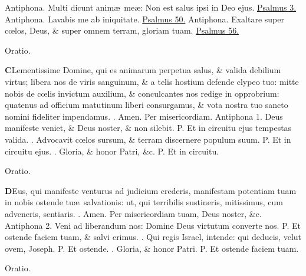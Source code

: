 \documentclass[letter,11pt]{book}
\makeatletter
\DeclareRobustCommand{\Vbar}{\vers@resp{-0.1em}{V}}
\DeclareRobustCommand{\Rbar}{\vers@resp{0pt}{R}}
\newcommand{\vers@resp@sym}{\raisebox{0.2ex}{\rotatebox[origin=c]{-20}{$\m@th\rceil$}}}
\newcommand{\vers@resp}[2]{%
  {\ooalign{\hidewidth\kern#1\vers@resp@sym\hidewidth\cr#2\cr}}%
}%
\def\P{\color{Red} P. \color{black}}
\def\V{\color{Red} \Vbar . \color{black}}
\def\R{\color{Red} \Rbar . \color{black}}
\makeatother
\begin{document}
\begin{multicols}{2}
\newline \color{Red} Antiphona. \color{black} Multi dicunt anim\ae \ me\ae : Non est salus ipsi in Deo ejus. \color{Red} \hyperlink{ps3}{Psalmus 3.} \color{black}
\newline \color{Red} Antiphona. \color{black} Lavabis me ab iniquitate. \color{Red} \hyperlink{ps50}{Psalmus 50.} \color{black}
\newline \color{Red} Antiphona. \color{black} Exaltare super c\oe los, Deus, \& super omnem terram, gloriam tuam. \color{Red} \hyperlink{ps56}{Psalmus 56.} \color{black}
\vspace{-.75em} \begin{center} \color{Red} Oratio. \end{center} \vspace{-.75em}
\lettrine[lines=2]{\bfseries \color{Red} C}{}Lementissime Domine, qui es animarum perpetua salus, \& valida debilium virtus; libera nos de viris sanguinum, \& a telis hostium defende clypeo tuo: mitte nobis de c\oe lis invictum auxilium, \& conculcantes nos redige in opprobrium: quatenus
ad officium matutinum liberi consurgamus, \& vota nostra tuo sancto nomini fideliter impendamus. \R Amen. Per misericordiam.
\newline \color{Red} Antiphona 1. \color{black} Deus manifeste veniet, \& Deus noster, \& non silebit. \P Et in circuitu ejus tempestas valida. \V Advocavit c\oe los sursum, \& terram discernere populum suum. \P Et in circuitu ejus. \V Gloria, \& honor Patri, \&c. \P Et in circuitu.
\vspace{-.75em} \begin{center} \color{Red} Oratio. \end{center} \vspace{-.75em}
\lettrine[lines=2]{\bfseries \color{Red} D}{}Eus, qui manifeste venturus ad judicium crederis, manifestam potentiam tuam in nobis ostende tu\ae \ salvationis: ut, qui terribilis sustineris, mitissimus, cum adveneris, sentiaris. \R Amen. Per misericordiam tuam, Deus noster, \&c.
\newline \color{Red} Antiphona 2. \color{black} Veni ad liberandum nos: Domine Deus virtutum converte nos. \P Et ostende faciem tuam, \& salvi erimus. \V Qui regis Israel, intende: qui deducis, velut ovem, Joseph. \P Et ostende. \V Gloria, \& honor Patri. \P Et ostende faciem tuam.
\vspace{-.75em} \begin{center} \color{Red} Oratio. \end{center} \vspace{-.75em}

\end{multicols}
\end{document}

